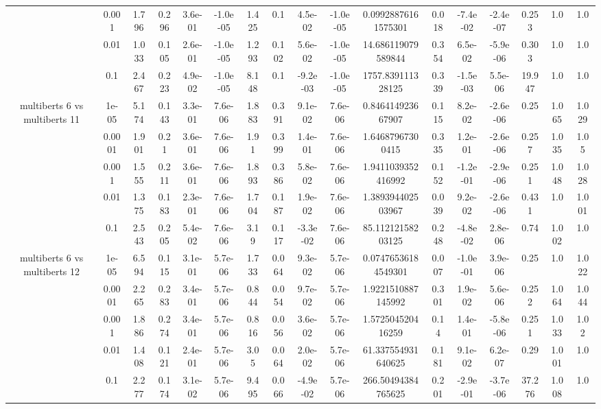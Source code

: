 \begin{tabular}{|c|c|c|c|c|c|c|c|c|c|c|c|c|c|c|c|c|}
 & 0.001 & 1.796 & 0.296 & 3.6e-01 & -1.0e-05 & 1.425 & 0.1 & 4.5e-02 & -1.0e-05 & 0.09928876161575301 & 0.018 & -7.4e-02 & -2.4e-07 & 0.253 & 1.0 & 1.0 \\
 & 0.01 & 1.033 & 0.105 & 2.6e-01 & -1.0e-05 & 1.293 & 0.102 & 5.6e-02 & -1.0e-05 & 14.686119079589844 & 0.354 & 6.5e-02 & -5.9e-06 & 0.303 & 1.0 & 1.0 \\
 & 0.1 & 2.467 & 0.223 & 4.9e-02 & -1.0e-05 & 8.148 & 0.1 & -9.2e-03 & -1.0e-05 & 1757.839111328125 & 0.339 & -1.5e-03 & 5.5e-06 & 19.947 & 1.0 & 1.0 \\
\hline
\multirow{5}{*}{multiberts 6 vs multiberts 11} & 1e-05 & 5.174 & 0.143 & 3.3e-01 & 7.6e-06 & 1.883 & 0.391 & 9.1e-02 & 7.6e-06 & 0.846414923667907 & 0.115 & 8.2e-02 & -2.6e-06 & 0.25 & 1.065 & 1.029 \\
 & 0.0001 & 1.901 & 0.21 & 3.6e-01 & 7.6e-06 & 1.91 & 0.399 & 1.4e-01 & 7.6e-06 & 1.64687967300415 & 0.335 & 1.2e-01 & -2.6e-06 & 0.257 & 1.035 & 1.05 \\
 & 0.001 & 1.555 & 0.211 & 3.6e-01 & 7.6e-06 & 1.893 & 0.386 & 5.8e-02 & 7.6e-06 & 1.9411039352416992 & 0.152 & -1.2e-01 & -2.9e-06 & 0.251 & 1.048 & 1.028 \\
 & 0.01 & 1.375 & 0.183 & 2.3e-01 & 7.6e-06 & 1.704 & 0.187 & 1.9e-02 & 7.6e-06 & 1.389394402503967 & 0.039 & 9.2e-02 & -2.6e-06 & 0.431 & 1.0 & 1.001 \\
 & 0.1 & 2.543 & 0.205 & 5.4e-02 & 7.6e-06 & 3.19 & 0.117 & -3.3e-02 & 7.6e-06 & 85.11212158203125 & 0.248 & -4.8e-02 & 2.8e-06 & 0.74 & 1.002 & 1.0 \\
\hline
\multirow{5}{*}{multiberts 6 vs multiberts 12} & 1e-05 & 6.594 & 0.115 & 3.1e-01 & 5.7e-06 & 1.733 & 0.064 & 9.3e-02 & 5.7e-06 & 0.07476536184549301 & 0.007 & -1.0e-01 & 3.9e-06 & 0.25 & 1.0 & 1.022 \\
 & 0.0001 & 2.265 & 0.283 & 3.4e-01 & 5.7e-06 & 0.844 & 0.054 & 9.7e-02 & 5.7e-06 & 1.9221510887145992 & 0.301 & 1.9e-02 & 5.6e-06 & 0.252 & 1.064 & 1.044 \\
 & 0.001 & 1.886 & 0.274 & 3.4e-01 & 5.7e-06 & 0.816 & 0.056 & 3.6e-02 & 5.7e-06 & 1.572504520416259 & 0.14 & 1.4e-01 & -5.8e-06 & 0.251 & 1.033 & 1.02 \\
 & 0.01 & 1.408 & 0.121 & 2.4e-01 & 5.7e-06 & 3.05 & 0.064 & 2.0e-02 & 5.7e-06 & 61.337554931640625 & 0.181 & 9.1e-02 & 6.2e-07 & 0.29 & 1.001 & 1.0 \\
 & 0.1 & 2.277 & 0.174 & 3.1e-02 & 5.7e-06 & 9.495 & 0.066 & -4.9e-02 & 5.7e-06 & 266.50494384765625 & 0.201 & -2.9e-01 & -3.7e-06 & 37.276 & 1.008 & 1.0 \\

\end{tabular}
